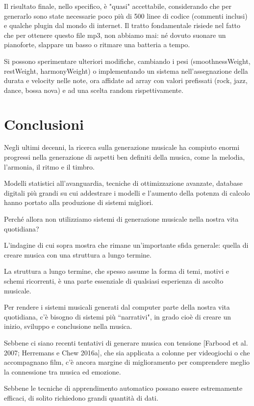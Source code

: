 \documentclass[a4paper,12pt]{report}
\begin{document}
Il risultato finale, nello specifico, è "quasi" accettabile, considerando che per generarlo sono state necessarie poco più di 500 linee di codice (commenti inclusi) e qualche plugin dal mondo di internet.
Il tratto fondamentale risiede nel fatto che per ottenere questo file mp3, non abbiamo mai: né dovuto suonare un pianoforte, slappare un basso o ritmare una batteria a tempo.

Si possono sperimentare ulteriori modifiche, cambiando i pesi (smoothnessWeight, restWeight, harmonyWeight) o implementando un sistema nell'assegnazione della durata e velocity nelle note, ora affidate ad array con valori prefissati (rock, jazz, dance, bossa nova) e ad una scelta random rispettivamente.

\chapter{Conclusioni}

Negli ultimi decenni, la ricerca sulla generazione musicale ha compiuto enormi progressi nella generazione di aspetti ben definiti della musica, come la melodia, l’armonia, il ritmo e il timbro. 

Modelli statistici all’avanguardia, tecniche di ottimizzazione avanzate, database digitali più grandi su cui addestrare i modelli e l’aumento della potenza di calcolo hanno portato alla produzione di sistemi migliori. 

Perché allora non utilizziamo sistemi di generazione musicale nella nostra vita quotidiana? 

L’indagine di cui sopra mostra che rimane un’importante sfida generale: quella di creare musica con una struttura a lungo termine.

La struttura a lungo termine, che spesso assume la forma di temi, motivi e schemi ricorrenti, è una parte essenziale di qualsiasi esperienza di ascolto musicale.

Per rendere i sistemi musicali generati dal computer parte della nostra vita quotidiana, c’è bisogno di sistemi più “narrativi", in grado cioè di creare un inizio, sviluppo e conclusione nella musica. 

Sebbene ci siano recenti tentativi di generare musica con tensione [Farbood et al. 2007; Herremans e Chew 2016a], che sia applicata a colonne per videogiochi o che accompagnano film, c’è ancora margine di miglioramento per comprendere meglio la connessione tra musica ed emozione.

Sebbene le tecniche di apprendimento automatico possano essere estremamente efficaci, di solito richiedono grandi quantità di dati. 
\end{document}

